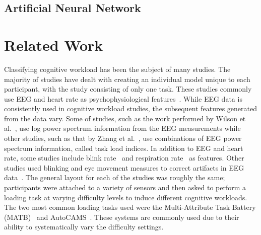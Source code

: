 \documentclass[11pt]{article}
\begin{document}
	\subsection{Artificial Neural Network}

\section{Related Work}
Classifying cognitive workload has been the subject of many studies. The majority of studies have dealt with creating an individual model unique to each participant, with the study consisting of only one task. These studies commonly use EEG and heart rate as psychophysiological features~\cite{Wang_R, Zhang, Wilson, Yang}. While EEG data is consistently used in cognitive workload studies, the subsequent features generated from the data vary. Some of studies, such as the work performed by Wilson et al.~\cite{Wilson}, use log power spectrum information from the EEG measurements while other studies, such as that by Zhang et al.~\cite{Zhang}, use combinations of EEG power spectrum information, called task load indices. In addition to EEG and heart rate, some studies include blink rate~\cite{Wilson, Wilson_2002} and respiration rate~\cite{Wilson_2003} as features. Other studies used blinking and eye movement measures to correct artifacts in EEG data~\cite{Wang_R}. The general layout for each of the studies was roughly the same; participants were attached to a variety of sensors and then asked to perform a loading task at varying difficulty levels to induce different cognitive workloads. The two most common loading tasks used were the Multi-Attribute Task Battery (MATB)~\cite{Comstock} and AutoCAMS~\cite{Lorenz}. These systems are commonly used due to their ability to systematically vary the difficulty settings. 
\end{document}
